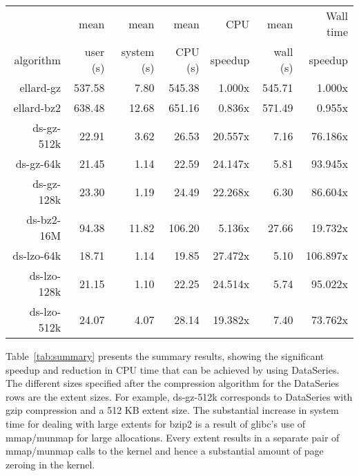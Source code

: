 \documentclass{acm_proc_article-sp}
\begin{document}
 
\begin{table*}
\centering
\begin{tabular}{|r|r|r|r|r|r|r|} \hline
            & mean     & mean       & mean     & CPU     & mean     & Wall time \\
algorithm   & user (s) & system (s) & CPU (s)  & speedup & wall (s) & speedup  \\ \hline
ellard-gz   & 537.58    &  7.80     & 545.38   &  1.000x & 545.71   &   1.000x \\
ellard-bz2  & 638.48    & 12.68     & 651.16   &  0.836x & 571.49   &   0.955x \\
\hline
ds-gz-512k  &  22.91    &  3.62     &  26.53   & 20.557x &   7.16   &  76.186x \\
ds-gz-64k   &  21.45    &  1.14     &  22.59   & 24.147x &   5.81   &  93.945x \\
ds-gz-128k  &  23.30    &  1.19     &  24.49   & 22.268x &   6.30   &  86.604x \\
\hline
ds-bz2-16M  &  94.38    & 11.82     & 106.20   &  5.136x &  27.66   &  19.732x \\
\hline
ds-lzo-64k  &  18.71    &  1.14     &  19.85   & 27.472x &   5.10   & 106.897x \\
ds-lzo-128k &  21.15    &  1.10     &  22.25   & 24.514x &   5.74   &  95.022x \\
ds-lzo-512k &  24.07    &  4.07     &  28.14   & 19.382x &   7.40   &  73.762x \\ \hline
\end{tabular}

\caption{
Summary of performance results for the two analysis programs
operating on a variety of input files.  The analysis was run over the
anon-home04-011118-* files.  For the ellard {\tt nfsscan} program
the text files were compressed with either gz or bz2.  For the
DataSeries {\tt ellardanalysis} program, the DataSeries files were
compressed with either gz, bz2, or lzo, and used various extent sizes
as specified.  CPU and wall time are both relative to ellard-gz.
}

\label{tab:summary}
\end{table*}


Table~\ref{tab:summary} presents the summary results, showing the
significant speedup and reduction in CPU time that can be achieved by
using DataSeries.  The different sizes specified after the compression
algorithm for the DataSeries rows are the extent sizes. 
For example, ds-gz-512k corresponds to DataSeries with gzip
compression and a 512 KB extent size.
The substantial increase in system time for dealing
with large extents for bzip2 is a result of glibc's use of mmap/munmap
for large allocations.  Every extent results in a separate pair of
mmap/munmap calls to the kernel and hence a substantial amount of page
zeroing in the kernel.  
\end{document}
